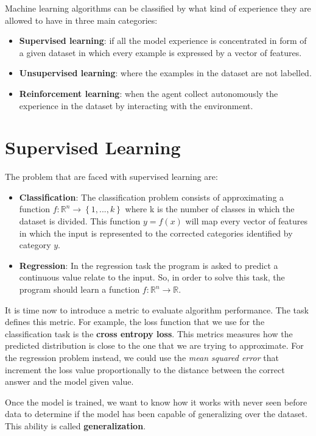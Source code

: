 Machine learning algorithms can be classified by what kind of experience they are allowed to have in three main categories:
\begin{itemize}
\item \textbf{Supervised learning}: if all the model experience is concentrated in form of a given dataset in which every example is expressed by a vector of features. 
\item \textbf{Unsupervised learning}: where the examples in the dataset are not labelled.
\item \textbf{Reinforcement learning}: when the agent collect autonomously the experience in the dataset by interacting with the environment.
\end{itemize}

\section{Supervised Learning}
The problem that are faced with supervised learning are:
\begin{itemize}
\item \textbf{Classification}:  The classification problem consists of approximating a function $f:\mathbb{R}^n \rightarrow \left \{  1,...,k \right \}$ where k is the number of classes in which the dataset is divided.
This function $ y = f(x)$ will map every vector of features in which the input is represented to the corrected categories identified by category $y$.
\item \textbf{Regression}: In the regression task the program is asked to predict a continuous value relate to the input. So, in order to solve this task, the program should learn a function $f: \mathbb{R}^{n} \rightarrow \mathbb{R}$. 
\end{itemize}

It is time now to introduce a metric to evaluate algorithm performance. The task defines this metric.
For example, the loss function that we use for the classification task is the \textbf{cross entropy loss}. This metrics measures how the predicted distribution is close to the one that we are trying to approximate.
For the regression problem instead,  we could use the \textit{mean squared error} that increment the loss value proportionally to the distance between the correct answer and the model given value.

Once the model is trained, we want to know how it works with never seen before data to determine if the model has been capable of generalizing over the dataset. 
This ability is called \textbf{generalization}.

